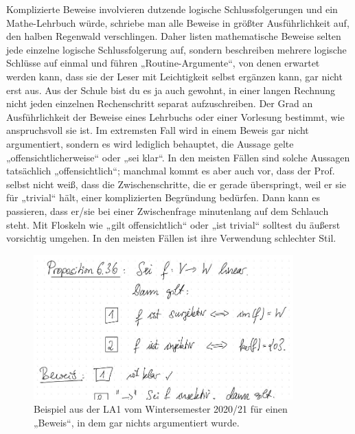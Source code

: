 \begin{bem}
 Komplizierte Beweise involvieren dutzende logische Schlussfolgerungen und ein Mathe-Lehrbuch würde, schriebe man alle Beweise in größter Ausführlichkeit auf, den halben Regenwald verschlingen. Daher listen mathematische Beweise selten jede einzelne logische Schlussfolgerung auf, sondern beschreiben mehrere logische Schlüsse auf einmal und führen „Routine-Argumente“, von denen erwartet werden kann, dass sie der Leser mit Leichtigkeit selbst ergänzen kann, gar nicht erst aus. Aus der Schule bist du es ja auch gewohnt, in einer langen Rechnung nicht jeden einzelnen Rechenschritt separat aufzuschreiben. Der Grad an Ausführlichkeit der Beweise eines Lehrbuchs oder einer Vorlesung bestimmt, wie anspruchsvoll sie ist. Im extremsten Fall wird in einem Beweis gar nicht argumentiert, sondern es wird lediglich behauptet, die Aussage gelte „offensichtlicherweise“ oder „sei klar“. In den meisten Fällen sind solche Aussagen tatsächlich „offensichtlich“; manchmal kommt es aber auch vor, dass der Prof. selbst nicht weiß, dass die Zwischenschritte, die er gerade überspringt, weil er sie für „trivial“ hält, einer komplizierten Begründung bedürfen. Dann kann es passieren, dass er/sie bei einer Zwischenfrage minutenlang auf dem Schlauch steht. Mit Floskeln wie „gilt offensichtlich“ oder „ist trivial“ solltest du äußerst vorsichtig umgehen. In den meisten Fällen ist ihre Verwendung schlechter Stil.
 \begin{figure}[H]
\begin{center}
\includegraphics[width=10cm]{./_img/Istklar.jpeg}
\end{center}
\centering \caption{Beispiel aus der LA1 vom Wintersemester 2020/21 für einen „Beweis“, in dem gar nichts argumentiert wurde.}
\end{figure}
\end{bem}




